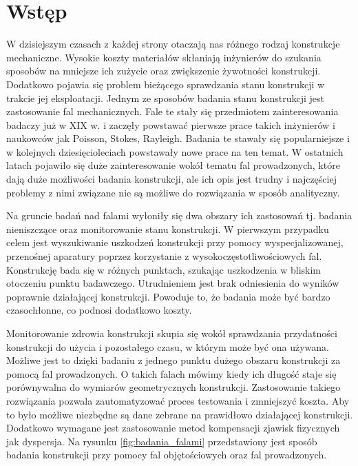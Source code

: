 
\chapter{Wstęp}
\label{cha:wstep}


W dzisiejszym czasach z każdej strony otaczają nas różnego rodzaj konstrukcje mechaniczne. Wysokie koszty materiałów skłaniają inżynierów do szukania sposobów na mniejsze ich zużycie oraz zwiększenie żywotności konstrukcji. Dodatkowo pojawia się problem bieżącego sprawdzania stanu konstrukcji w trakcie jej eksploatacji. Jednym ze sposobów badania stanu konstrukcji jest zastosowanie fal mechanicznych. Fale te stały się przedmiotem zainteresowania badaczy już w XIX w. i zaczęły powstawać pierwsze prace takich inżynierów i naukowców jak Poisson, Stokes, Rayleigh. Badania te stawały się popularniejsze i w kolejnych dziesięcioleciach powstawały nowe prace na ten temat. W ostatnich latach pojawiło się duże zainteresowanie wokół tematu fal prowadzonych, które dają duże możliwości badania konstrukcji, ale ich opis jest trudny i najczęściej problemy z nimi związane nie są możliwe do rozwiązania w sposób analityczny.

Na gruncie badań nad falami wyłoniły się dwa obszary ich zastosowań tj. badania nieniszczące oraz monitorowanie stanu konstrukcji. W pierwszym przypadku celem jest wyszukiwanie uszkodzeń konstrukcji przy pomocy wyspecjalizowanej, przenośnej aparatury poprzez korzystanie z wysokoczęstotliwościowych fal. Konstrukcję bada się w różnych punktach, szukając uszkodzenia w bliskim otoczeniu punktu badawczego. Utrudnieniem jest brak odniesienia do wyników poprawnie działającej konstrukcji. Powoduje to, że badania może być bardzo czasochłonne, co podnosi dodatkowo koszty.

Monitorowanie zdrowia konstrukcji skupia się wokół sprawdzania przydatności konstrukcji do użycia i pozostałego czasu, w którym może być ona używana. Możliwe jest to dzięki badaniu z jednego punktu dużego obszaru konstrukcji za pomocą fal prowadzonych. O takich falach mówimy kiedy ich długość staje się porównywalna do wymiarów geometrycznych konstrukcji. Zastosowanie takiego rozwiązania pozwala zautomatyzować proces testowania i zmniejszyć koszta. Aby to było możliwe niezbędne są dane zebrane na prawidłowo działającej konstrukcji. Dodatkowo wymagane jest zastosowanie metod kompensacji zjawisk fizycznych jak dyspersja. Na rysunku \ref{fig:badania_falami} przedstawiony jest sposób badania konstrukcji przy pomocy fal objętościowych oraz fal prowadzonych.

